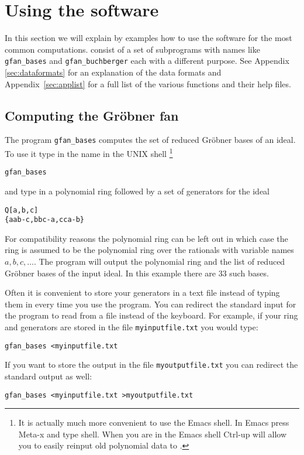 \newpage
\section{Using the software}
In this section we will explain by examples how to use the software
for the most common computations. \name consist of a set of subprograms
with names like \texttt{gfan\_bases} and \texttt{gfan\_buchberger} each with
a different purpose. See Appendix \ref{sec:dataformats} for an
explanation of the data formats and Appendix~\ref{sec:applist} for a
full list of the various functions and their help files.


\subsection{Computing the Gr\"obner fan}
The program \texttt{gfan\_bases} computes the set of reduced Gr\"obner bases
of an ideal. To use it type in the name in the UNIX shell \footnote{It is actually much more convenient to use the Emacs shell. In Emacs press Meta-x and type \textup{shell}. When you are in the Emacs shell Ctrl-up will allow you to easily reinput old polynomial data to \name.}
\begin{verbatim}
gfan_bases
\end{verbatim}
and type in a polynomial ring followed by a set of generators for the ideal
\begin{verbatim}
Q[a,b,c]
{aab-c,bbc-a,cca-b}
\end{verbatim}
For compatibility reasons the polynomial ring can be left out in which case the ring is assumed to be the polynomial ring over the rationals with variable names $a,b,c,\dots$.
The program will output the polynomial ring and the list of
reduced Gr\"obner bases of the input ideal. In this example there are
33 such bases.

Often it is convenient to store your generators in a text file instead
of typing them in every time you use the program. You can redirect the
standard input for the program to read from a file instead of the
keyboard. For example, if your ring and generators are stored in the file
\texttt{myinputfile.txt} you would type:
\begin{verbatim}
gfan_bases <myinputfile.txt
\end{verbatim}
If you want to store the output in the file \texttt{myoutputfile.txt}
you can redirect the standard output as well:
\begin{verbatim}
gfan_bases <myinputfile.txt >myoutputfile.txt
\end{verbatim}


